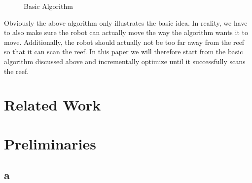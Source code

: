 \documentclass[twoside, 12pt]{article}
\begin{document}
\begin{figure}
\vspace{-26pt}
  \begin{center}
  \end{center}
\vspace{-20pt}
  \caption{Basic Algorithm}
  \label{fig:basicAlgorithm}
\end{figure}

\begin{figure}
\vspace{-50pt}
\end{figure}

Obviously the above algorithm only illustrates the basic idea. In reality, we have to also make sure the robot can actually move the way the algorithm wants it to move. Additionally, the robot should actually not be too far away from the reef so that it can scan the reef. In this paper we will therefore start from the basic algorithm discussed above and incrementally optimize until it successfully scans the reef. \\

\section{Related Work}
\label{sec:relatedworks}

  
\section{Preliminaries}
\label{sec:preliminaries}

\subsection{a}
\end{document}
